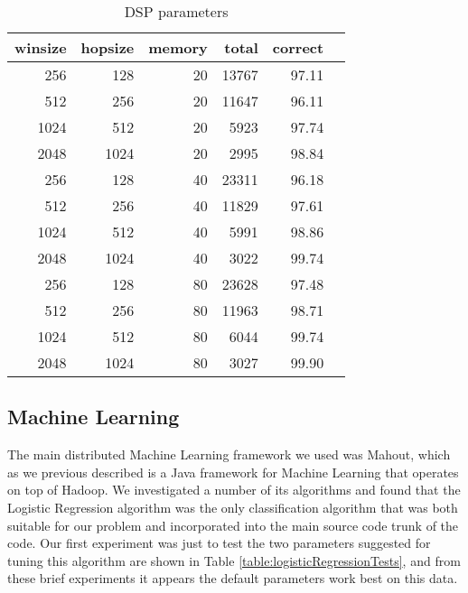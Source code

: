 \begin{table}
\begin{tabular}{|r|r|r|r|r|r|}
\hline
 winsize  &  hopsize  &  memory  &  total &   correct  \\
\hline
     256  &      128  &      20  &        13767   &    97.11  \\
     512  &      256  &      20  &        11647   &    96.11  \\
    1024  &      512  &      20  &         5923   &    97.74  \\
    2048  &     1024  &      20  &         2995   &    98.84  \\
\hline
     256  &      128  &      40  &        23311   &    96.18  \\
     512  &      256  &      40  &        11829   &    97.61  \\
    1024  &      512  &      40  &         5991   &    98.86  \\
    2048  &     1024  &      40  &         3022   &    99.74  \\
\hline
     256  &      128  &      80  &        23628   &    97.48  \\
     512  &      256  &      80  &        11963   &    98.71  \\
    1024  &      512  &      80  &         6044   &    99.74  \\
    2048  &     1024  &      80  &         3027   &    99.90  \\
\hline
\end{tabular}
\caption{DSP parameters}
\label{table:dspParams}
\end{table}

\subsection{Machine Learning}

The main distributed Machine Learning framework we used was Mahout,
which as we previous described is a Java framework for Machine
Learning that operates on top of Hadoop.  We investigated a number of
its algorithms and found that the Logistic Regression algorithm was
the only classification algorithm that was both suitable for our
problem and incorporated into the main source code trunk of the code.
Our first experiment was just to test the two parameters suggested for
tuning this algorithm are shown in Table
\ref{table:logisticRegressionTests}, and from these brief experiments
it appears the default parameters work best on this data.


